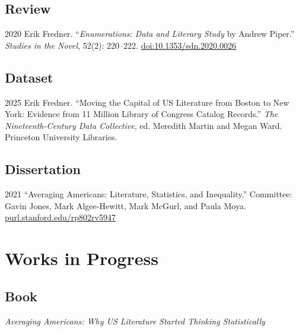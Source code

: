 \documentclass[12pt,letterpaper]{report}
\begin{document}
\subsection*{Review}

\begin{tablist}
	\item[2020] \tab{}Erik Fredner. \enquote{\emph{Enumerations: Data and Literary Study} by Andrew Piper.} \textit{Studies in the Novel}, 52(2): 220--222. \href{https://doi.org/10.1353/sdn.2020.0026}{doi:10.1353/sdn.2020.0026}
\end{tablist}

\subsection*{Dataset}

\begin{tablist}
	\item[2025] \tab{}Erik Fredner. \enquote{Moving the Capital of US Literature from Boston to New York: Evidence from 11 Million Library of Congress Catalog Records.} \emph{The Nineteenth-Century Data Collective}, ed. Meredith Martin and Megan Ward. Princeton University Libraries.
\end{tablist}

\subsection*{Dissertation}

\begin{tablist}
	\item[2021] \tab{}\enquote{Averaging Americans: Literature, Statistics, and Inequality.}
	Committee: Gavin Jones, Mark Algee-Hewitt, Mark McGurl, and Paula Moya.
	\href{https://purl.stanford.edu/rp802rv5947}{purl.stanford.edu/rp802rv5947}
\end{tablist}

\section*{Works in Progress}

\subsection*{Book}

\textit{Averaging Americans: Why US Literature Started Thinking Statistically}

\smallskip
\end{document}

